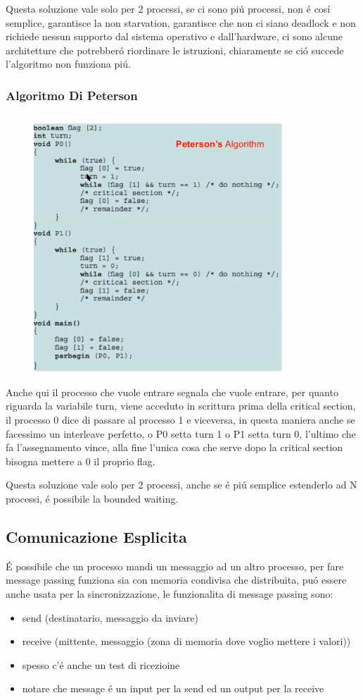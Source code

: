 Questa soluzione vale solo per 2 processi, se ci sono piú processi, non é cosí semplice, garantisce la non starvation,
garantisce che non ci siano deadlock e non richiede nessun supporto dal sistema operativo e dall'hardware, ci sono alcune
architetture che potrebberó riordinare le istruzioni, chiaramente se ció succede l'algoritmo non funziona piú.

\subsubsection*{Algoritmo Di Peterson}
\begin{figure}[H]
    \centering
    \includegraphics[width=0.7\linewidth]{immagini/AlgoritmoDIPeterson}
\end{figure}
Anche qui il processo che vuole entrare segnala che vuole entrare, per quanto riguarda la variabile turn, viene acceduto in
scrittura prima della critical section, il processo 0 dice di passare al processo 1 e viceversa, in questa maniera
anche se facessimo un interleave perfetto, o P0 setta turn 1 o P1 setta turn 0, l'ultimo che fa l'assegnamento vince, alla fine
l'unica cosa che serve dopo la critical section bisogna mettere a 0 il proprio flag.

Questa soluzione vale solo per 2 processi, anche se é piú semplice estenderlo ad N processi, é possibile la bounded waiting.

\subsection{Comunicazione Esplicita}

É possibile che un processo mandi un messaggio ad un altro processo, per fare message passing funziona sia con memoria condivisa
che distribuita, puó essere anche usata per la sincronizzazione, le funzionalita di message passing sono:
\begin{itemize}
    \item send (destinatario, messaggio da inviare)
    \item receive (mittente, messaggio (zona di memoria dove voglio mettere i valori))
    \item spesso c'é anche un test di ricezioine
    \item notare che message é un input per la send ed un output per la receive
\end{itemize}
